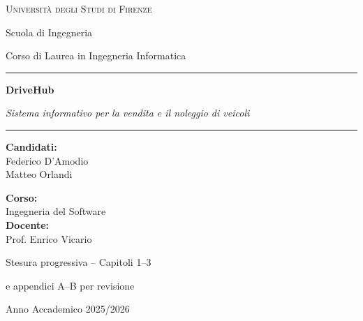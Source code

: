 \documentclass[12pt,a4paper]{report}
\begin{document}
\hypersetup{pageanchor=false}
\begin{titlepage}
  \centering
  {\Large\textsc{Università degli Studi di Firenze}\par}
  {\large Scuola di Ingegneria\par}
  {\large Corso di Laurea in Ingegneria Informatica\par}
  \vspace{2cm}
  \rule{\linewidth}{.5pt}\par\vspace{.8cm}
  {\Huge\bfseries\color{blue!55!black} DriveHub\par}\vspace{.35cm}
  {\Large\itshape Sistema informativo per la vendita e il noleggio di veicoli\par}
  \vspace{.8cm}\rule{\linewidth}{.5pt}\par
  \vspace{1.7cm}
  \begin{minipage}[t]{.48\linewidth}\raggedright
    \textbf{Candidati:}\\[.3cm]
    Federico D'Amodio\\
    Matteo Orlandi
  \end{minipage}\hfill
  \begin{minipage}[t]{.48\linewidth}\raggedleft
    \textbf{Corso:}\\
    Ingegneria del Software\\[.35cm]
    \textbf{Docente:}\\
    Prof. Enrico Vicario
  \end{minipage}
  \vfill
  {\small Stesura progressiva -- Capitoli 1--3\par
  e appendici A--B per revisione\par}
  \vspace{.4cm}
  {\large Anno Accademico 2025/2026\par}
\end{titlepage}
\hypersetup{pageanchor=true}
\tableofcontents
\clearpage
{}





\appendix

\end{document}

